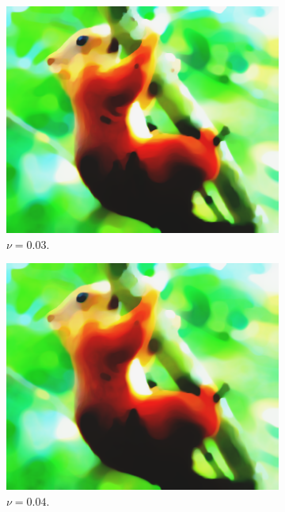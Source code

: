 \documentclass[abstracton]{scrreprt}
\begin{document}
\begin{figure}[!ht]
\begin{subfigure}[b]{0.16\textwidth}
                    \includegraphics[width=\textwidth]{img/segmentation/cr/003squirrel.png}
                    \caption{$\nu = 0.03$.}
                \end{subfigure}
                \begin{subfigure}[b]{0.16\textwidth}
                    \includegraphics[width=\textwidth]{img/segmentation/cr/004squirrel.png}
                    \caption{$\nu = 0.04$.}
                \end{subfigure}
                \begin{subfigure}[b]{0.16\textwidth}

\end{subfigure}
\end{figure}
\end{document}
